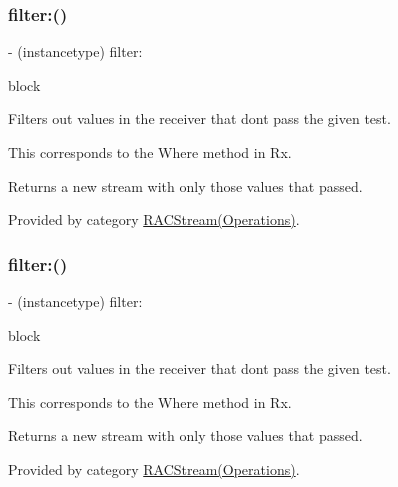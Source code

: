 \subsubsection{\texorpdfstring{filter\+:()}{filter:()}\hspace{0.1cm}{\footnotesize\ttfamily [2/3]}}
{\footnotesize\ttfamily -\/ (instancetype) filter\+: \begin{DoxyParamCaption}\item[{(B\+O\+OL($^\wedge$)(id value))}]{block }\end{DoxyParamCaption}}

Filters out values in the receiver that don\textquotesingle{}t pass the given test.

This corresponds to the {\ttfamily Where} method in Rx.

Returns a new stream with only those values that passed. 

Provided by category \mbox{\hyperlink{category_r_a_c_stream_07_operations_08_ae6a990d05708acea33f1c31102f4989b}{R\+A\+C\+Stream(\+Operations)}}.

\mbox{\label{interface_r_a_c_stream_ae6a990d05708acea33f1c31102f4989b}} 
\subsubsection{\texorpdfstring{filter\+:()}{filter:()}\hspace{0.1cm}{\footnotesize\ttfamily [3/3]}}
{\footnotesize\ttfamily -\/ (instancetype) filter\+: \begin{DoxyParamCaption}\item[{(B\+O\+OL($^\wedge$)(id value))}]{block }\end{DoxyParamCaption}}

Filters out values in the receiver that don\textquotesingle{}t pass the given test.

This corresponds to the {\ttfamily Where} method in Rx.

Returns a new stream with only those values that passed. 

Provided by category \mbox{\hyperlink{category_r_a_c_stream_07_operations_08_ae6a990d05708acea33f1c31102f4989b}{R\+A\+C\+Stream(\+Operations)}}.

\mbox{\label{interface_r_a_c_stream_a02767823dfe3d4682709e066e15e388c}} 
